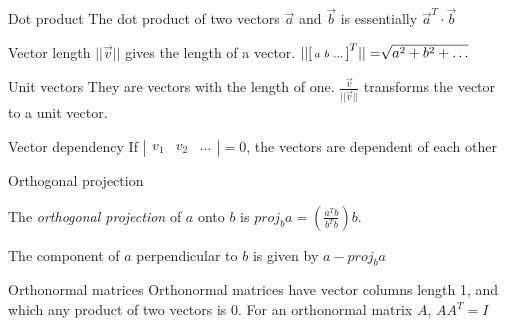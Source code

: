 \documentclass{article}
\begin{document}
\begin{knBox}[]{Dot product}
    The dot product of two vectors $\vec{a}$ and $\vec{b}$ is essentially $\vec{a}^T\cdot\vec{b}$
\end{knBox}
\begin{knBox}[]{Vector length}
    $||\vec{v}||$ gives the length of a vector. $||\begin{bsmallmatrix}
        a&b&\dots
    \end{bsmallmatrix}^T||=\sqrt[]{a^2 + b^2 + \dots}$
\end{knBox}
\begin{knBox}[]{Unit vectors}
    They are vectors with the length of one. $\frac{\vec{v}}{||\vec{v}||}$ transforms the vector to a unit vector.
\end{knBox}
\begin{propBox}[]{Vector dependency}
    If $|\begin{smallmatrix}
        v_1 & v_2 & \dots
    \end{smallmatrix}|=0$, the vectors are dependent of each other
\end{propBox}
\label{sec:dep}
\begin{knBox}[]{Orthogonal projection}

    \begin{minipage}{0.6\textwidth}
        The \emph{orthogonal projection} of $a$ onto $b$ is $proj_ba = (\frac{a^Tb}{b^Tb})b$. 
    
        The component of $a$ perpendicular to $b$ is given by $a-proj_ba$
      \end{minipage}
      \hfill
      \begin{minipage}{0.35\textwidth}
      \end{minipage}

\end{knBox}
\begin{propBox}[]{Orthonormal matrices}
    Orthonormal matrices have vector columns length 1, and which any product of two vectors is 0.
    For an orthonormal matrix $A$, $AA^T = I$
\end{propBox}
\end{document}
